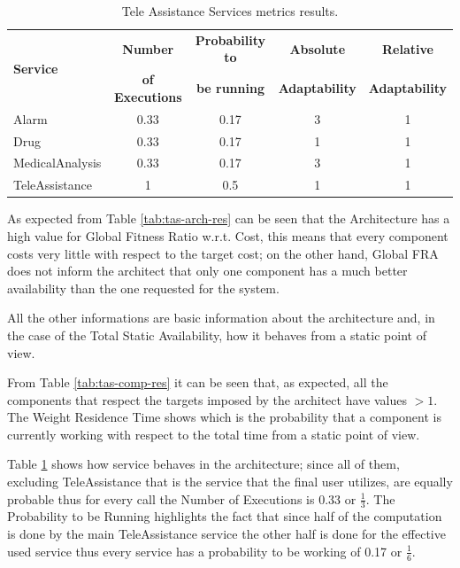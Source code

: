 \begin{table}[ht!b]
	\centering
	\begin{tabular}{|l|c|c|c|c|}
		\hline 
		\multirow{2}{*}{\textbf{Service}} & \textbf{Number} & \textbf{Probability to} & \textbf{Absolute} & \textbf{Relative} \\ 
		& \textbf{of Executions} & \textbf{be running} & \textbf{Adaptability} & \textbf{Adaptability} \\
		\hline 
		Alarm & 0.33 & 0.17 & 3 & 1 \\
		\hline 
		Drug & 0.33 & 0.17 & 1 & 1 \\
		\hline 
		MedicalAnalysis & 0.33 & 0.17 & 3 & 1 \\
		\hline 
		TeleAssistance & 1 & 0.5 & 1 & 1 \\
		\hline
	\end{tabular} 
	\caption[TAS Service Services Metrics]{Tele Assistance Services metrics results.}
	\label{tab:tas-serv-res}
\end{table}

As expected from Table \ref{tab:tas-arch-res} can be seen that the Architecture has a high value for Global Fitness Ratio w.r.t. Cost, this means that every component costs very little with respect to the target cost; on the other hand, Global FRA does not inform the architect that only one component has a much better availability than the one requested for the system. 

All the other informations are basic information about the architecture and, in the case of the Total Static Availability, how it behaves from a static point of view.

From Table \ref{tab:tas-comp-res} it can be seen that, as expected, all the components that respect the targets imposed by the architect have values $>1$. The Weight Residence Time shows which is the probability that a component is currently working with respect to the total time from a static point of view.

Table \ref{tab:tas-serv-res} shows how service behaves in the architecture; since all of them, excluding TeleAssistance that is the service that the final user utilizes, are equally probable thus for every call the Number of Executions is 0.33 or $\frac{1}{3}$. The Probability to be Running highlights the fact that since half of the computation is done by the main TeleAssistance service the other half is done for the effective used service thus every service has a probability to be working of 0.17 or $\frac{1}{6}$.

